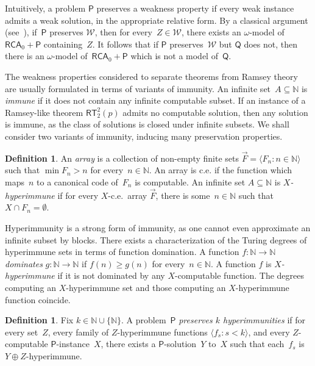 \documentclass{article}
\newcommand{\Psf}{\mathsf{P}}
\newcommand{\Qsf}{\mathsf{Q}}
\def\W{\mathcal{W}}
\newcommand{\cs}{2^{\NN}}
\newcommand{\RCA}[0]{\mathsf{RCA}}
\newcommand{\RT}[0]{\mathsf{RT}}
\newcommand{\NN}[0]{\mathbb{N}}
\def\NN{\mathbb{N}}
\numberwithin{theorem}{section}
\theoremstyle{definition}
\newtheorem{definition}[theorem]{Definition}
\begin{document}

Intuitively, a problem $\Psf$ preserves a weakness property if every weak instance admits a weak solution, in the appropriate relative form. By a classical argument (see~\cite[Section 3.4]{patey2016reverse}), if~$\Psf$ preserves $\W$, then for every~$Z \in \W$, there exists an $\omega$-model of~$\RCA_0 + \Psf$ containing~$Z$. It follows that if $\Psf$ preserves~$\W$ but $\Qsf$ does not, then there is an $\omega$-model of~$\RCA_0 + \Psf$ which is not a model of~$\Qsf$.

The weakness properties considered to separate theorems from Ramsey theory are usually formulated in terms of variants of immunity. An infinite set~$A \subseteq \NN$ is \emph{immune} if it does not contain any infinite computable subset. If an instance of a Ramsey-like theorem $\RT^2_2(p)$ admits no computable solution, then any solution is immune, as the class of solutions is closed under infinite subsets. We shall consider two variants of immunity, inducing many preservation properties.

\begin{definition}
An \emph{array} is a collection of non-empty finite sets $\vec{F} = \langle F_n : n \in \NN \rangle$ such that $\min F_n > n$ for every~$n \in \NN$. An array is c.e. if the function which maps~$n$ to a canonical code of~$F_n$ is computable. An infinite set $A \subseteq \NN$ is \emph{$X$-hyperimmune} if for every $X$-c.e.\ array $\vec{F}$, there is some~$n \in \NN$ such that $X \cap F_n = \emptyset$.
\end{definition}

Hyperimmunity is a strong form of immunity, as one cannot even approximate an infinite subset by blocks. There exists a characterization of the Turing degrees of hyperimmune sets in terms of function domination.
A function $f : \NN \to \NN$ \emph{dominates} $g : \NN \to \NN$ if $f(n) \geq g(n)$ for every~$n \in \NN$.
A function $f$ is \emph{$X$-hyperimmune} if it is not dominated by any $X$-computable function. The degrees computing an $X$-hyperimmune set and those computing an $X$-hyperimmune function coincide.

\begin{definition}Fix $k \in \NN \cup \{\NN\}$.
A problem~$\Psf$ \emph{preserves $k$ hyperimmunities} if for every set~$Z$,
every family of $Z$-hyperimmune functions $\langle f_s : s < k \rangle$, and every $Z$-computable $\Psf$-instance~$X$, there exists a $\Psf$-solution~$Y$ to~$X$ such that each~$f_s$ is $Y \oplus Z$-hyperimmune.
\end{definition}
\end{document}
